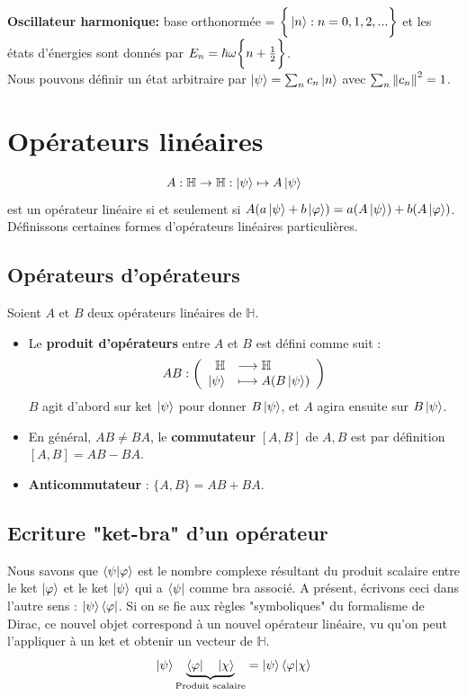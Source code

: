 \documentclass[../notesdecours.tex]{subfiles}
\begin{document}
\textbf{Oscillateur harmonique:} base orthonormée = $\bigg\{\ket{n} : n=0,1,2,...\bigg\}$ et les états d'énergies sont donnés par $E_n = \hbar\omega\bigg\{n+\frac{1}{2}\bigg\}$.\\

Nous pouvons définir un état arbitraire par $\ket{\psi} = \sum_n c_n \ket{n}$ avec $\sum_n \norm{c_n}^2 = 1$.

\section{Opérateurs linéaires}
$$A : \mathbb{H} \rightarrow \mathbb{H} : \ket{\psi} \mapsto A\ket{\psi}$$ est un opérateur linéaire si et seulement si $A(a\ket{\psi}+b\ket{\varphi}) = a(A\ket{\psi})+b(A\ket{\varphi})$. Définissons certaines formes d'opérateurs linéaires particulières.

\subsection{Opérateurs d'opérateurs}
Soient $A$ et $B$ deux opérateurs linéaires de $\mathbb{H}$.
\begin{itemize}
\item Le \textbf{produit d'opérateurs} entre $A$ et $B$ est défini comme suit :
$$AB : \left( 
	\begin{array}{rl}
		\mathbb{H} &\longrightarrow \mathbb{H} \\
		\ket \psi &\longmapsto A(B\ket \psi)
	\end{array}
\right) $$
$B$ agit d'abord sur ket $\ket{\psi}$ pour donner $B\ket{\psi}$, et $A$ agira ensuite sur $B\ket{\psi}$.
\item En général, $AB\neq BA$, le \textbf{commutateur} $[A,B]$ de $A,B$ est par définition $[A,B] = AB-BA$.
\item \textbf{Anticommutateur} : $\bigg\{A,B\bigg\} = AB+BA$.
\end{itemize}
\subsection{Ecriture "ket-bra" d'un opérateur}
Nous savons que $\braket{\psi | \varphi}$ est le nombre complexe résultant du produit scalaire entre le ket $\ket \varphi$ et le ket $\ket \psi$ qui a $\bra \psi$ comme bra associé. A présent, écrivons ceci dans l'autre sens : $\ket \psi \bra \varphi$. Si on se fie aux règles "symboliques" du formalisme de Dirac, ce nouvel objet correspond à un nouvel opérateur linéaire, vu qu'on peut l'appliquer à un ket et obtenir un vecteur de $\mathbb{H}$.
$$\ket \psi \underbrace{\bra \varphi \quad \ket \chi}_{\text{Produit scalaire}} = \ket \psi \braket{\varphi | \chi}$$
\end{document}
